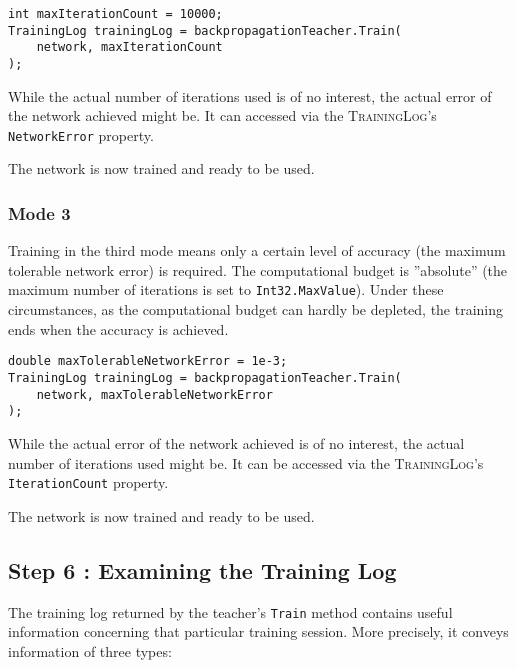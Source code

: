 \medskip

\begin{verbatim}
int maxIterationCount = 10000;
TrainingLog trainingLog = backpropagationTeacher.Train(
    network, maxIterationCount
);
\end{verbatim}

\medskip

While the actual number of iterations used is of no interest, the actual error of the network achieved might be. It can accessed via the \textsc{TrainingLog}'s \texttt{NetworkError} property.
  
The network is now trained and ready to be used.
  
\subsubsection{Mode 3}

Training in the third mode means only a certain level of accuracy (the maximum tolerable network error) is required. The computational budget is ''absolute'' (the maximum number of iterations is set to \texttt{Int32.MaxValue}). Under these circumstances, as the computational budget can hardly be depleted, the training ends when the accuracy is achieved.

\medskip

\begin{verbatim}
double maxTolerableNetworkError = 1e-3;
TrainingLog trainingLog = backpropagationTeacher.Train(
    network, maxTolerableNetworkError
);
\end{verbatim}

\medskip

While the actual error of the network achieved is of no interest, the actual number of iterations used might be. It can be accessed via the \textsc{TrainingLog}'s \texttt{IterationCount} property.
  
The network is now trained and ready to be used.

\subsection{Step 6 : Examining the Training Log}

The training log returned by the teacher's \texttt{Train} method contains useful information concerning that particular training session. More precisely, it conveys information of three types:


